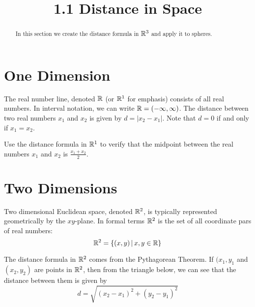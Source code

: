 \documentclass[handout]{ximera}
\title{1.1 Distance in Space}
\begin{document}
\begin{abstract}
In this section we create the distance formula in $\mathbb R^3$ and apply it to spheres.
\end{abstract}

\maketitle


\section{One Dimension}

The real number line, denoted $\mathbb R$ (or $\mathbb R^1$ for emphasis) consists of all real numbers.  In interval notation, we can write $\mathbb R = (-\infty, \infty)$.
The distance between two real numbers $x_1$ and $x_2$ is given by $d = |x_2 - x_1|$. Note that $d = 0$ if and only if $x_1 = x_2$.


\begin{center}
\end{center}

\begin{problem}
Use the distance formula in $\mathbb R^1$ to verify that the midpoint between the real numbers $x_1$ and $x_2$ is $\displaystyle \frac{x_1 +x_2}{2}$.
\end{problem}

\section{Two Dimensions}
Two dimensional Euclidean space, denoted $\mathbb R^2$, is typically represented geometrically by the $xy$-plane. 
In formal terms $\mathbb R^2$ is the set of all coordinate pars of real numbers:
 \[
\mathbb R^2 = \{(x,y) \,|\, x, y \in \mathbb R\}
\]

The distance formula in $\mathbb R^2$ comes from the Pythagorean Theorem. If $(x_1, y_1$ and $(x_2, y_2)$ are points in $\mathbb R^2$, then from the triangle below,
we can see that the distance between them is given by 
\[
d = \sqrt{(x_2 - x_1)^2 + (y_2 - y_1)^2}
\]
\end{document}
